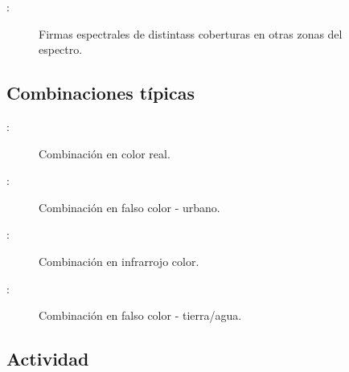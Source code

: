 \documentclass[]{beamer}
\begin{document}
\begin{frame}{\secname : \subsecname}
    \begin{figure}[h!]
        \centering
        \caption{Firmas espectrales de distintass coberturas en otras zonas del espectro.}
        \label{}
    \end{figure}
\end{frame}

\subsection{Combinaciones típicas}

\begin{frame}{\secname : \subsecname}
    \begin{figure}[h!]
        \centering
        \caption{Combinación en color real.}
        \label{}
    \end{figure}
\end{frame}

\begin{frame}{\secname : \subsecname}
    \begin{figure}[h!]
        \centering
        \caption{Combinación en falso color - urbano.}
        \label{}
    \end{figure}
\end{frame}

\begin{frame}{\secname : \subsecname}
    \begin{figure}[h!]
        \centering
        \caption{Combinación en infrarrojo color.}
        \label{}
    \end{figure}
\end{frame}

\begin{frame}{\secname : \subsecname}
    \begin{figure}[h!]
        \centering
        \caption{Combinación en falso color - tierra/agua.}
        \label{}
    \end{figure}
\end{frame}

\subsection{Actividad}
\end{document}
